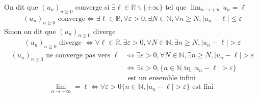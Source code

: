 \begin{graybox}
    \begin{definition}[]
    On dit que $(u_n)_{n \geqslant 0}$ converge si $\exists \ell \in \mathbb{R} \backslash \{\pm\infty\}$ tel que $\displaystyle{\lim_{n \to +\infty} u_n = \ell}$
    \begin{align*}
        (u_n)_{n \geqslant 0} \text{ converge} \iff \exists \ell \in \mathbb{R}, \forall \varepsilon > 0, \exists N \in \mathbb{N}, \forall n \geqslant N, \left|u_n - \ell\right| \leqslant \varepsilon
    \end{align*}
    Sinon on dit que $(u_n)_{n \geqslant 0}$ diverge
    \begin{align*}
        (u_n)_{n \geqslant 0} \text{ diverge } \iff \forall \ell \in \mathbb{R}, \exists \varepsilon > 0, \forall N \in \mathbb{N}, \exists n \geqslant N, \left|u_n - \ell \right| > \varepsilon
    \end{align*}
    \begin{align*}
        (u_n)_{n \geqslant 0} \text{ ne converge pas vers  }\ell &\iff \exists \varepsilon > 0, \forall N \in \mathbb{N}, \exists n \geqslant N, |u_n - \ell| > \varepsilon \\
        &\iff \exists \varepsilon > 0, \{n \in \mathbb{N} \text{ tq } |u_n - \ell| > \varepsilon\} \\ &\text{ est un ensemble infini}
    \end{align*}
    \begin{align*}
        \lim_{n \to +\infty} = \ell \iff \forall \varepsilon > 0 \{n \in \mathbb{N}, |u_n - \ell| > \varepsilon\} \text{ est fini }
    \end{align*}
\end{definition}
\end{graybox}

